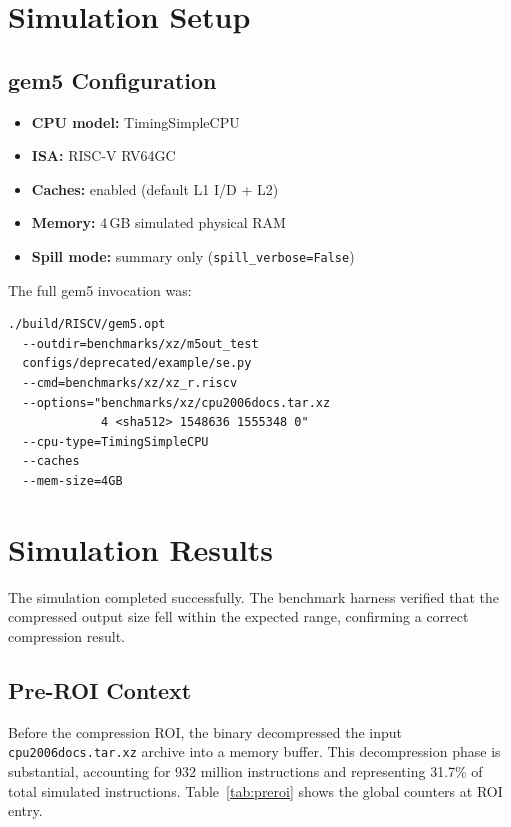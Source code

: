 \documentclass[conference]{IEEEtran}
\begin{document}
\section{Simulation Setup}

\subsection{gem5 Configuration}

\begin{itemize}
    \item \textbf{CPU model:}   TimingSimpleCPU
    \item \textbf{ISA:}         RISC-V RV64GC
    \item \textbf{Caches:}      enabled (default L1 I/D + L2)
    \item \textbf{Memory:}      4\,GB simulated physical RAM
    \item \textbf{Spill mode:}  summary only (\texttt{spill\_verbose=False})
\end{itemize}

The full gem5 invocation was:

\begin{verbatim}
./build/RISCV/gem5.opt
  --outdir=benchmarks/xz/m5out_test
  configs/deprecated/example/se.py
  --cmd=benchmarks/xz/xz_r.riscv
  --options="benchmarks/xz/cpu2006docs.tar.xz
             4 <sha512> 1548636 1555348 0"
  --cpu-type=TimingSimpleCPU
  --caches
  --mem-size=4GB
\end{verbatim}

\section{Simulation Results}

The simulation completed successfully. The benchmark harness verified
that the compressed output size fell within the expected range,
confirming a correct compression result.

\subsection{Pre-ROI Context}

Before the compression ROI, the binary decompressed the input
\texttt{cpu2006docs.tar.xz} archive into a memory buffer. This
decompression phase is substantial, accounting for 932 million
instructions and representing 31.7\% of total simulated instructions.
Table~\ref{tab:preroi} shows the global counters at ROI entry.
\end{document}
